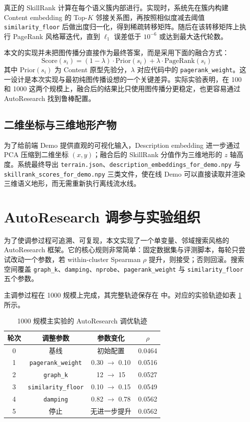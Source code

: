 真正的 SkillRank 计算在每个语义簇内部进行。实现时，系统先在簇内构建 Content embedding 的 Top-$K$ 邻接关系图，再按照相似度减去阈值 \texttt{similarity\_floor} 后做出度归一化，得到稀疏转移矩阵。随后在该转移矩阵上执行 PageRank 风格幂迭代，直到 $\ell_1$ 误差低于 $10^{-6}$ 或达到最大迭代轮数。

本文的实现并未把图传播分直接作为最终答案，而是采用下面的融合方式：
\[
\mathrm{Score}(s_i) = (1-\lambda)\cdot \mathrm{Prior}(s_i) + \lambda \cdot \mathrm{PageRank}(s_i)
\]
其中 $\mathrm{Prior}(s_i)$ 为 Content 原型先验分，$\lambda$ 对应代码中的 \texttt{pagerank\_weight}。这一设计是本次实现与最初纯图传播设想的一个关键差异。实际实验表明，在 100 和 1000 这两个规模上，融合后的结果比只使用图传播分更稳定，也更容易通过 AutoResearch 找到鲁棒配置。

\subsection{二维坐标与三维地形产物}

为了给前端 Demo 提供直观的可视化输入，Description embedding 进一步通过 PCA 压缩到二维坐标 $(x, y)$；融合后的 SkillRank 分值作为三维地形的 $z$ 轴高度。系统最终导出 \texttt{terrain.json}、\texttt{description\_embeddings\_for\_demo.npy} 与 \texttt{skillrank\_scores\_for\_demo.npy} 三类文件，使在线 Demo 可以直接读取并渲染三维语义地形，而无需重新执行离线流水线。

\section{AutoResearch 调参与实验组织}
\label{sec:autoresearch_impl}

为了使调参过程可追溯、可复现，本文实现了一个单变量、邻域搜索风格的 AutoResearch 框架。它的核心规则非常简单：固定数据集与评测脚本，每轮只尝试改动一个参数，若 within-cluster Spearman $\rho$ 提升，则接受；否则回滚。搜索空间覆盖 \texttt{graph\_k}、\texttt{damping}、\texttt{nprobe}、\texttt{pagerank\_weight} 与 \texttt{similarity\_floor} 五个参数。

主调参过程在 1000 规模上完成，其完整轨迹保存在  中。对应的实验轨迹如表 \ref{tab:autoresearch_trace_impl} 所示。

\begin{table}[htbp]
\centering
\caption{1000 规模主实验的 AutoResearch 调优轨迹}
\label{tab:autoresearch_trace_impl}
\begin{tabular}{cccc}
\toprule
轮次 & 调整参数 & 参数变化 & $\rho$ \\
\midrule
0 & 基线 & 初始配置 & 0.0464 \\
1 & \texttt{pagerank\_weight} & 0.30 $\rightarrow$ 0.10 & 0.0516 \\
2 & \texttt{graph\_k} & 12 $\rightarrow$ 15 & 0.0527 \\
3 & \texttt{similarity\_floor} & 0.10 $\rightarrow$ 0.15 & 0.0549 \\
4 & \texttt{damping} & 0.82 $\rightarrow$ 0.78 & 0.0562 \\
5 & 停止 & 无进一步提升 & 0.0562 \\
\bottomrule
\end{tabular}
\end{table}

